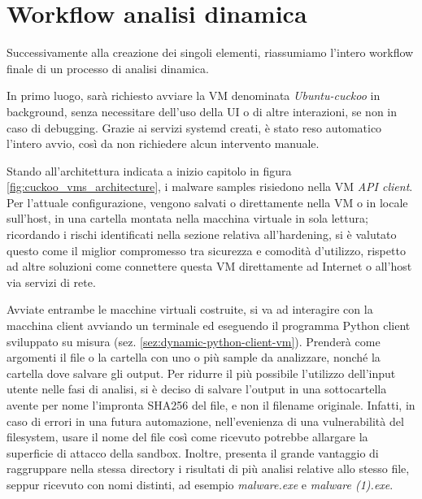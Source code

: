 \section{Workflow analisi dinamica}
Successivamente alla creazione dei singoli elementi, riassumiamo l'intero workflow finale di un processo di analisi dinamica.

In primo luogo, sarà richiesto avviare la VM denominata \emph{Ubuntu-cuckoo} in background, senza necessitare dell'uso della UI o di altre interazioni, se non in caso di debugging. Grazie ai servizi systemd creati, è stato reso automatico l'intero avvio, così da non richiedere alcun intervento manuale.

Stando all'architettura indicata a inizio capitolo in figura \ref{fig:cuckoo_vms_architecture}, i malware samples risiedono nella VM \emph{API client}. Per l'attuale configurazione, vengono salvati o direttamente nella VM o in locale sull'host, in una cartella montata nella macchina virtuale in sola lettura; ricordando i rischi identificati nella sezione relativa all'hardening, si è valutato questo come il miglior compromesso tra sicurezza e comodità d'utilizzo, rispetto ad altre soluzioni come connettere questa VM direttamente ad Internet o all'host via servizi di rete.

Avviate entrambe le macchine virtuali costruite, si va ad interagire con la macchina client avviando un terminale ed eseguendo il programma Python client sviluppato su misura (sez. \ref{sez:dynamic-python-client-vm}).
Prenderà come argomenti il file o la cartella con uno o più sample da analizzare, nonché la cartella dove salvare gli output.
Per ridurre il più possibile l'utilizzo dell'input utente nelle fasi di analisi, si è deciso di salvare l'output in una sottocartella avente per nome l'impronta SHA256 del file, e non il filename originale.
Infatti, in caso di errori in una futura automazione, nell'evenienza di una vulnerabilità del filesystem, usare il nome del file così come ricevuto potrebbe allargare la superficie di attacco della sandbox.
Inoltre, presenta il grande vantaggio di raggruppare nella stessa directory i risultati di più analisi relative allo stesso file, seppur ricevuto con nomi distinti, ad esempio \emph{malware.exe} e \emph{malware (1).exe}.

